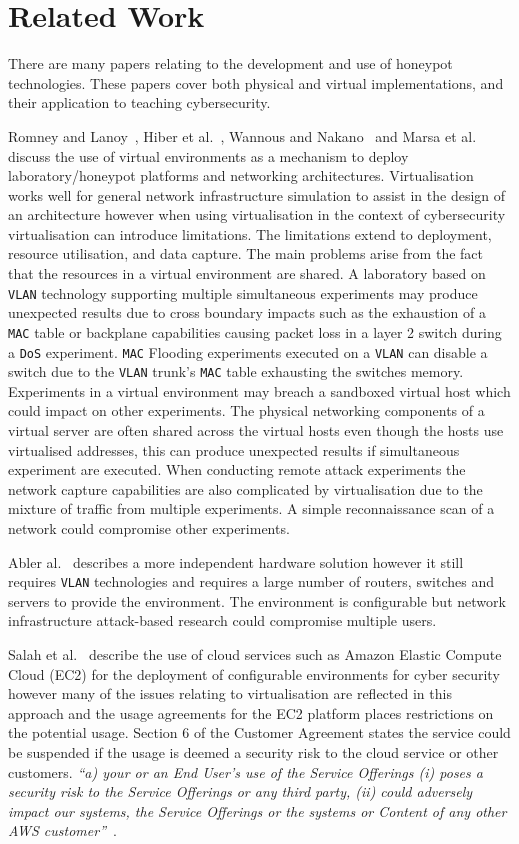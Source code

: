 \documentclass[10pt,journal]{IEEEtran}
\begin{document}
\section{Related Work}\label{sec:RelatedWork}
There are many papers relating to the development and use of honeypot technologies. These papers cover both physical and virtual implementations, and their application to teaching cybersecurity. 

Romney and Lanoy~\cite{LR:06}, Hiber et al.~\cite{HRS:08}, Wannous and Nakano~\cite{WN:10} and Marsa et al.~\cite{MGDL:13} discuss the use of virtual environments as a mechanism to deploy laboratory/honeypot platforms and networking architectures. Virtualisation works well for general network infrastructure simulation to assist in the design of an architecture however when using virtualisation in the context of cybersecurity virtualisation can introduce limitations. The limitations extend to deployment, resource utilisation, and data capture. The main problems arise from the fact that the resources in a virtual environment are shared. A laboratory based on \texttt{VLAN} technology supporting multiple simultaneous experiments may produce unexpected results due to cross boundary impacts such as the exhaustion of a \texttt{MAC} table or backplane capabilities causing packet loss in a layer 2 switch during a \texttt{DoS} experiment. \texttt{MAC} Flooding experiments executed on a \texttt{VLAN} can disable a switch due to the \texttt{VLAN} trunk's \texttt{MAC} table exhausting the switches memory. Experiments in a virtual environment may breach a sandboxed virtual host which could impact on other experiments. The physical networking components of a virtual server are often shared across the virtual hosts even though the hosts use virtualised addresses, this can produce unexpected results if simultaneous experiment are executed. When conducting remote attack experiments the network capture capabilities are also complicated by virtualisation due to the mixture of traffic from multiple experiments. A simple reconnaissance scan of a network could compromise other experiments.

Abler al.~\cite{ACG:06} describes a more independent hardware solution however it still requires \texttt{VLAN} technologies and requires a large number of routers, switches and servers to provide the environment. The environment is configurable but network infrastructure attack-based research could compromise multiple users.

Salah et al.~\cite{SHZ:15} describe the use of cloud services such as Amazon Elastic Compute Cloud (EC2) for the deployment of configurable environments for cyber security however many of the issues relating to virtualisation are reflected in this approach and the usage agreements for the EC2 platform places restrictions on the potential usage. Section 6 of the Customer Agreement states the service could be suspended if the usage is deemed a security risk to the cloud service or other customers. \textit{``a) your or an End User’s use of the Service Offerings (i) poses a security risk to the Service Offerings or any third party, (ii) could adversely impact our systems, the Service Offerings or the systems or Content of any other AWS customer''}~\cite{AWS:18}.
\end{document}
